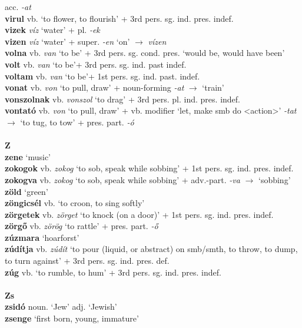 \documentclass[11pt]{article}
\begin{document}
acc. \emph{-at} \\
\textbf{virul} vb. `to flower, to flourish' + 3rd
pers. sg. ind. pres. indef. \\
\textbf{vizek} \emph{víz} `water' + pl. \emph{-ek} \\
\textbf{vizen} \emph{víz} `water' + super. \emph{-en} `on'
$\rightarrow$ \emph{vízen} \\
\textbf{volna} vb. \emph{van} `to be' + 3rd
pers. sg. cond. pres. `would be, would have been' \\
\textbf{volt} vb. \emph{van} `to be'+ 3rd pers. sg. ind. past
indef. \\
\textbf{voltam} vb. \emph{van} `to be'+ 1st
pers. sg. ind. past. indef. \\
\textbf{vonat} vb. \emph{von} `to pull, draw' +
noun\hyp{}forming \emph{-at} $\rightarrow$ `train' \\
\textbf{vonszolnak} vb. \emph{vonszol} `to drag' + 3rd
pers. pl. ind. pres. indef. \\
\textbf{vontató} vb. \emph{von} `to pull, draw' + vb. modifier `let,
make smb do <action>' \emph{-tat} $\rightarrow$ `to tug, to tow' +
pres. part. \emph{-ó} \\
\ \\
\noindent \textbf{\large Z} \\
\textbf{zene} `music' \\
\textbf{zokogok} vb. \emph{zokog} `to sob, speak while sobbing' + 1st
pers. sg. ind. pres. indef. \\
\textbf{zokogva} vb. \emph{zokog} `to sob, speak while sobbing' +
adv.\hyp{}part. \emph{-va} $\rightarrow$ `sobbing' \\
\textbf{zöld} `green' \\
\textbf{zöngicsél} vb. `to croon, to sing softly' \\
\textbf{zörgetek} vb. \emph{zörget} `to knock (on a door)' + 1st
pers. sg. ind. pres. indef. \\
\textbf{zörgő} vb. \emph{zörög} `to rattle' + pres. part. \emph{-ő} \\
\textbf{zúzmara} `hoarforst' \\
\textbf{zúdítja} vb. \emph{zúdít} `to pour (liquid, or abstract) on
smb/smth, to throw, to dump, to turn against' + 3rd
pers. sg. ind. pres. def. \\
\textbf{zúg} vb. `to rumble, to hum' + 3rd
pers. sg. ind. pres. indef. \\
\ \\
\noindent \textbf{\large Zs} \\
\textbf{zsidó} noun. `Jew' \textbar\textbar{} adj. `Jewish' \\
\textbf{zsenge} `first born, young, immature' \\
\end{document}

